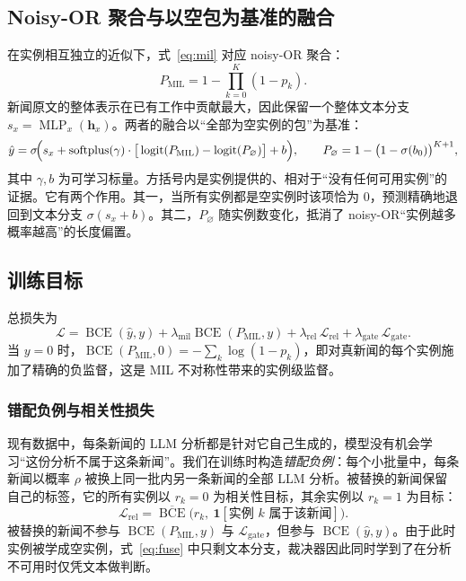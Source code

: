 \subsection{Noisy-OR 聚合与以空包为基准的融合}\label{sec:agg}

在实例相互独立的近似下，式~\eqref{eq:mil} 对应 noisy-OR 聚合\citep{maron1998framework}：
\begin{equation}
P_{\mathrm{MIL}}=1-\prod_{k=0}^{K}(1-p_k).
\end{equation}
新闻原文的整体表示在已有工作中贡献最大\citep{he2026factguard}，因此保留一个整体文本分支 $s_x=\operatorname{MLP}_x(\bm h_x)$。两者的融合以“全部为空实例的包”为基准：
\begin{equation}
\hat y=\sigma\!\Big(s_x+\operatorname{softplus}(\gamma)\cdot\big[\operatorname{logit}(P_{\mathrm{MIL}})-\operatorname{logit}(P_{\varnothing})\big]+b\Big),\qquad
P_{\varnothing}=1-\big(1-\sigma(b_0)\big)^{K+1},\label{eq:fuse}
\end{equation}
其中 $\gamma,b$ 为可学习标量。方括号内是实例提供的、相对于“没有任何可用实例”的证据。它有两个作用。其一，当所有实例都是空实例时该项恰为 $0$，预测精确地退回到文本分支 $\sigma(s_x+b)$。其二，$P_{\varnothing}$ 随实例数变化，抵消了 noisy-OR“实例越多概率越高”的长度偏置。

\subsection{训练目标}\label{sec:loss}

总损失为
\begin{equation}
\mathcal L=\operatorname{BCE}(\hat y,y)+\lambda_{\mathrm{mil}}\operatorname{BCE}(P_{\mathrm{MIL}},y)+\lambda_{\mathrm{rel}}\,\mathcal L_{\mathrm{rel}}+\lambda_{\mathrm{gate}}\,\mathcal L_{\mathrm{gate}} .
\end{equation}
当 $y{=}0$ 时，$\operatorname{BCE}(P_{\mathrm{MIL}},0)=-\sum_k\log(1-p_k)$，即对真新闻的每个实例施加了精确的负监督，这是 MIL 不对称性带来的实例级监督。

\subsubsection{错配负例与相关性损失}
现有数据中，每条新闻的 LLM 分析都是针对它自己生成的，模型没有机会学习“这份分析不属于这条新闻”。我们在训练时构造\emph{错配负例}：每个小批量中，每条新闻以概率 $\rho$ 被换上同一批内另一条新闻的全部 LLM 分析。被替换的新闻保留自己的标签，它的所有实例以 $r_k=0$ 为相关性目标，其余实例以 $r_k=1$ 为目标：
\begin{equation}
\mathcal L_{\mathrm{rel}}=\overline{\operatorname{BCE}}\big(r_k,\ \mathbf{1}[\text{实例 }k\text{ 属于该新闻}]\big).
\end{equation}
被替换的新闻不参与 $\operatorname{BCE}(P_{\mathrm{MIL}},y)$ 与 $\mathcal L_{\mathrm{gate}}$，但参与 $\operatorname{BCE}(\hat y,y)$。由于此时实例被学成空实例，式~\eqref{eq:fuse} 中只剩文本分支，裁决器因此同时学到了在分析不可用时仅凭文本做判断。

